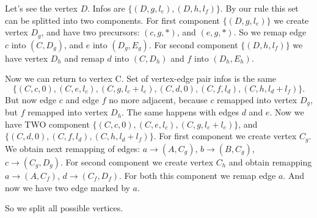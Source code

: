 \documentclass[12pt,a4paper,oneside]{article}
\begin{document}
Let's see the vertex $D$. Infos are $\{(D,g,l_e),(D,h,l_f)\}$. By our rule
this set can be splitted into two components. For first component
$\{(D,g,l_e)\}$ we create vertex $D_g$, and have two precursors: $(c,g,*)$,
and $(e,g,*)$. So we remap edge $c$ into $(C, D_g)$, and $e$ into $(D_g, E_g)$.
For second component $\{(D,h,l_f)\}$ we have vertex $D_h$ and remap $d$ into
$(C,D_h)$ and $f$ into $(D_h,E_h)$.

Now we can return to vertex C. Set of vertex-edge pair infos is the
same $$\{(C,c,0), (C,e,l_c), (C,g,l_c+l_e), (C,d,0), (C,f,l_d),
(C,h,l_d+l_f)\}.$$
But now edge $c$ and edge $f$ no more adjacent, because $c$ remapped into
vertex $D_g$, but $f$ remapped into vertex $D_h$. The same happens with edges
$d$ and $e$. Now we have TWO component $\{(C,c,0), (C,e,l_c),
(C,g,l_c+l_e)\}$, and $\{(C,d,0), (C,f,l_d), (C,h,l_d+l_f)\}$. For first
component we create vertex $C_g$. We obtain next remapping of edges: $a
\rightarrow (A, C_g)$, $b \rightarrow (B, C_g)$, $c \rightarrow (C_g, D_g)$.
For second component we create vertex $C_h$ and obtain remapping $a \rightarrow
(A, C_f)$, $d \rightarrow (C_f, D_f)$. For both this component we remap edge $a$.
And now we have two edge marked by $a$.

So we split all possible vertices.
\end{document}

